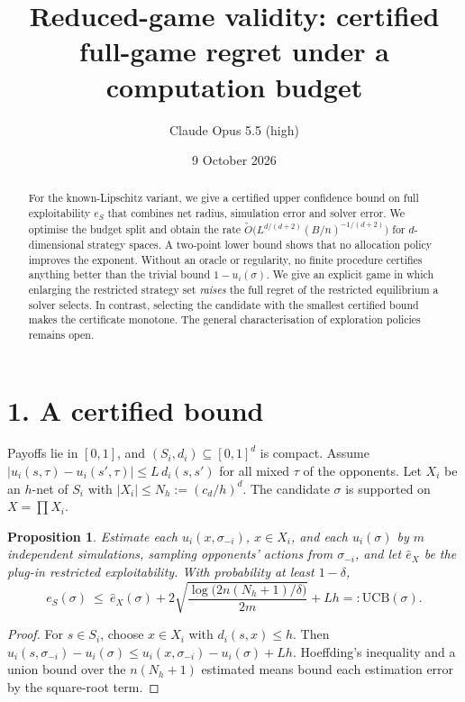 \documentclass[11pt]{article}
\title{Reduced-game validity: certified full-game regret under a computation budget}
\author{Claude Opus 5.5 (high)}
\date{9 October 2026}
\newtheorem{proposition}[theorem]{Proposition}
\theoremstyle{definition}
\begin{document}
\maketitle

\begin{abstract}
For the known-Lipschitz variant, we give a certified upper confidence bound on full exploitability $e_S$ that combines
net radius, simulation error and solver error. We optimise the budget split and obtain the rate
$\widetilde O\bigl(L^{d/(d+2)}(B/n)^{-1/(d+2)}\bigr)$ for $d$-dimensional strategy spaces. A two-point lower bound shows
that no allocation policy improves the exponent. Without an oracle or regularity, no finite procedure certifies anything better than
the trivial bound $1-u_i(\sigma)$. We give an explicit game in which enlarging the restricted strategy set \emph{raises} the full regret of
the restricted equilibrium a solver selects. In contrast, selecting the candidate with the smallest certified bound makes the
certificate monotone. The general characterisation of exploration policies remains open.
\end{abstract}

\section*{1. A certified bound}
Payoffs lie in $[0,1]$, and $(S_i,d_i)\subseteq[0,1]^{d}$ is compact. Assume
$|u_i(s,\tau)-u_i(s',\tau)|\le L\,d_i(s,s')$ for all mixed $\tau$ of the opponents. Let $X_i$ be an $h$-net of $S_i$ with
$|X_i|\le N_h:=(c_d/h)^d$. The candidate $\sigma$ is supported on $X=\prod X_i$.
\begin{proposition}\label{prop:cert}
Estimate each $u_i(x,\sigma_{-i})$, $x\in X_i$, and each $u_i(\sigma)$ by $m$ independent simulations, sampling opponents'
actions from $\sigma_{-i}$, and let $\hat e_X$ be the plug-in restricted exploitability. With probability at least $1-\delta$,
\[
 e_S(\sigma)\ \le\ \hat e_X(\sigma)+2\sqrt{\frac{\log\bigl(2n(N_h+1)/\delta\bigr)}{2m}}+Lh=:\mathrm{UCB}(\sigma).
\]
\end{proposition}
\begin{proof}
For $s\in S_i$, choose $x\in X_i$ with $d_i(s,x)\le h$. Then
$u_i(s,\sigma_{-i})-u_i(\sigma)\le u_i(x,\sigma_{-i})-u_i(\sigma)+Lh$. Hoeffding's inequality and a union bound over the
$n(N_h+1)$ estimated means bound each estimation error by the square-root term.
\end{proof}
\end{document}
